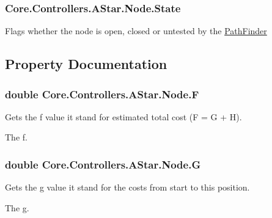 \subsubsection[{State}]{ Core.\+Controllers.\+A\+Star.\+Node.\+State}\label{classCore_1_1Controllers_1_1AStar_1_1Node_ab00b1c1216243bb73857cbee2831f662}


Flags whether the node is open, closed or untested by the \hyperlink{classCore_1_1Controllers_1_1AStar_1_1PathFinder}{Path\+Finder} 



\subsection{Property Documentation}
\hypertarget{classCore_1_1Controllers_1_1AStar_1_1Node_a41c0c83fe6dc82b87b6654ed171351b9}{}
\subsubsection[{F}]{\setlength{\rightskip}{0pt plus 5cm}double Core.\+Controllers.\+A\+Star.\+Node.\+F\hspace{0.3cm}{\ttfamily [get]}}\label{classCore_1_1Controllers_1_1AStar_1_1Node_a41c0c83fe6dc82b87b6654ed171351b9}


Gets the f value it stand for estimated total cost (F = G + H). 

The f.\hypertarget{classCore_1_1Controllers_1_1AStar_1_1Node_a53a25b3c833102975ae2d3526f58abcc}{}
\subsubsection[{G}]{\setlength{\rightskip}{0pt plus 5cm}double Core.\+Controllers.\+A\+Star.\+Node.\+G\hspace{0.3cm}{\ttfamily [get]}}\label{classCore_1_1Controllers_1_1AStar_1_1Node_a53a25b3c833102975ae2d3526f58abcc}


Gets the g value it stand for the costs from start to this position. 

The g.\hypertarget{classCore_1_1Controllers_1_1AStar_1_1Node_affebd55aa7d7b5471b1157055f5c2a7a}{}
